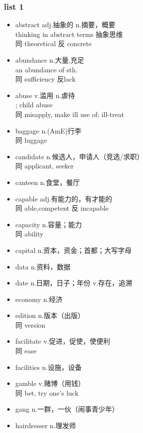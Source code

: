 \documentclass[11pt,a4paper,UTF8,titlepage]{ctexart} %
\begin{document}
    \subsubsection{list 1}
    \begin{multicols}{2}
    \begin{itemize}[left=0em]
        \item abstract adj.抽象的 n.摘要，概要\\thinking in abstract terms 抽象思维\\同 theoretical 反 concrete
        \item abundance n.大量,充足\\an abundance of sth.\\同 sufficiency 反lack
        \item abuse v.滥用 n.虐待\\; child abuse\\同 misapply, make ill use of; ill-treat
        \item baggage n.(AmE)行李 \\同 luggage
        \item candidate n.候选人，申请人（竞选/求职）\\同 applicant, seeker
        \item canteen n.食堂，餐厅
        \item capable adj.有能力的，有才能的\\同 able,competent 反 incapable
        \item capacity n.容量；能力\\同 ability
        \item capital n.资本，资金；首都；大写字母
        \item data n.资料，数据
        \item date n.日期，日子；年份 v.存在，追溯\\
        \item economy n.经济
        \item edition n.版本（出版）\\同 version
        \item facilitate v.促进，促使，使便利\\同 ease
        \item facilities n.设施，设备
        \item gamble v.赌博（用钱）\\同 bet, try one's luck
        \item gang n.一群，一伙（闹事青少年）
        \item hairdresser n.理发师

\end{itemize}
\end{multicols}
\end{document}
